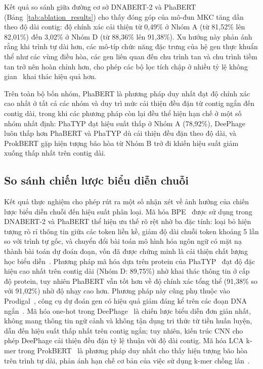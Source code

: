 Kết quả so sánh giữa đường cơ sở DNABERT-2 và PhaBERT (Bảng~\ref{tab:ablation_results}) cho thấy đóng góp của mô-đun MKC tăng dần theo độ dài contig: độ chính xác cải thiện từ 0,49\% ở Nhóm A (từ 81,52\% lên 82,01\%) đến 3,02\% ở Nhóm D (từ 88,36\% lên 91,38\%). Xu hướng này phản ánh rằng khi trình tự dài hơn, các mô-típ chức năng đặc trưng của hệ gen thực khuẩn thể như các vùng điều hòa, các gen liên quan đến chu trình tan và chu trình tiềm tan trở nên hoàn chỉnh hơn, cho phép các bộ lọc tích chập ở nhiều tỷ lệ không gian~\cite{kim2014convolutional} khai thác hiệu quả hơn.

Trên toàn bộ bốn nhóm, PhaBERT là phương pháp duy nhất đạt độ chính xác cao nhất ở tất cả các nhóm và duy trì mức cải thiện đều đặn từ contig ngắn đến contig dài, trong khi các phương pháp còn lại đều thể hiện hạn chế ở một số nhóm nhất định: PhaTYP đạt hiệu suất thấp ở Nhóm A (78,92\%), DeePhage luôn thấp hơn PhaBERT và PhaTYP dù cải thiện đều đặn theo độ dài, và ProkBERT gặp hiện tượng bão hòa từ Nhóm B trở đi khiến hiệu suất giảm xuống thấp nhất trên contig dài.

\subsection{So sánh chiến lược biểu diễn chuỗi}
\label{sec:bieu_dien_chuoi}

Kết quả thực nghiệm cho phép rút ra một số nhận xét về ảnh hưởng của chiến lược biểu diễn chuỗi đến hiệu suất phân loại. Mã hóa BPE~\cite{sennrich2015neural} được sử dụng trong DNABERT-2 và PhaBERT thể hiện ưu thế rõ rệt nhờ ba đặc tính: loại bỏ hiện tượng rò rỉ thông tin giữa các token liền kề, giảm độ dài chuỗi token khoảng 5 lần so với trình tự gốc, và chuyển đổi bài toán mô hình hóa ngôn ngữ có mặt nạ thành bài toán dự đoán đoạn, vốn đã được chứng minh là cải thiện chất lượng học biểu diễn~\cite{raffel2020exploring}. Phương pháp mã hóa dựa trên protein của PhaTYP~\cite{shang2023phatyp} đạt độ đặc hiệu cao nhất trên contig dài (Nhóm D: 89,75\%) nhờ khai thác thông tin ở cấp độ protein, tuy nhiên PhaBERT vẫn tốt hơn về độ chính xác tổng thể (91,38\% so với 91,02\%) nhờ độ nhạy cao hơn. Phương pháp này cũng phụ thuộc vào Prodigal~\cite{hyatt2010prodigal}, công cụ dự đoán gen có hiệu quả giảm đáng kể trên các đoạn DNA ngắn~\cite{trimble2012short}. Mã hóa one-hot trong DeePhage~\cite{wu2021deephage} là chiến lược biểu diễn đơn giản nhất, không mang thông tin ngữ cảnh và không tận dụng tri thức từ tiền huấn luyện, dẫn đến hiệu suất thấp nhất trên contig ngắn; tuy nhiên, kiến trúc CNN cho phép DeePhage cải thiện đều đặn tỷ lệ thuận với độ dài contig. Mã hóa LCA k-mer trong ProkBERT~\cite{ligeti2024prokbert} là phương pháp duy nhất cho thấy hiện tượng bão hòa trên trình tự dài, phản ánh hạn chế cơ bản của việc sử dụng k-mer chồng lấn~\cite{zhou2023dnabert}.


